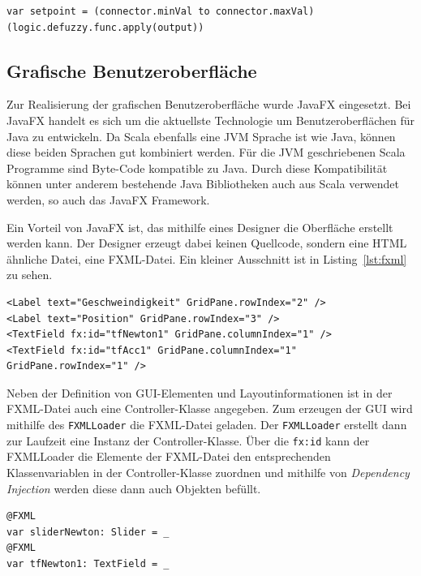 \documentclass[12pt,a4paper,bibliography=totocnumbered,listof=totocnumbered, abstracton]{scrartcl}
\theoremstyle{Umgebung}
\begin{document}
\begin{lstlisting}[firstnumber=1, style=myScalastyle, caption=Anwendung der Defuzzifizierungs-Methode, label=lst:defuzzy]
	var setpoint = (connector.minVal to connector.maxVal)(logic.defuzzy.func.apply(output))
\end{lstlisting}

\subsection{Grafische Benutzeroberfläche}
Zur Realisierung der grafischen Benutzeroberfläche wurde JavaFX eingesetzt. Bei JavaFX handelt es sich um die aktuellste Technologie um Benutzeroberflächen für Java zu entwickeln. Da Scala ebenfalls eine JVM Sprache ist wie Java, können diese beiden Sprachen gut kombiniert werden. Für die JVM geschriebenen Scala Programme sind Byte-Code kompatible zu Java. Durch diese Kompatibilität können unter anderem bestehende Java Bibliotheken auch aus Scala verwendet werden, so auch das JavaFX Framework.

Ein Vorteil von JavaFX ist, das mithilfe eines Designer die Oberfläche erstellt werden kann. Der Designer erzeugt dabei keinen Quellcode, sondern eine HTML ähnliche Datei, eine FXML-Datei. Ein kleiner Ausschnitt ist in Listing~\ref{lst:fxml} zu sehen.

\begin{lstlisting}[firstnumber=114, style=myScalastyle, caption={Kleiner Auszug aus einer FXML-Datei}, label=lst:fxml]
<Label text="Geschweindigkeit" GridPane.rowIndex="2" />
<Label text="Position" GridPane.rowIndex="3" />
<TextField fx:id="tfNewton1" GridPane.columnIndex="1" />
<TextField fx:id="tfAcc1" GridPane.columnIndex="1" GridPane.rowIndex="1" />
\end{lstlisting}

Neben der Definition von GUI-Elementen und Layoutinformationen ist in der FXML-Datei auch eine Controller-Klasse angegeben. Zum erzeugen der GUI wird mithilfe des \lstinline|FXMLLoader| die FXML-Datei geladen. Der \lstinline|FXMLLoader| erstellt dann zur Laufzeit eine Instanz der Controller-Klasse. Über die \lstinline|fx:id| kann der FXMLLoader die Elemente der FXML-Datei den entsprechenden Klassenvariablen in der Controller-Klasse zuordnen und mithilfe von \textit{Dependency Injection} werden diese dann auch Objekten befüllt.

\begin{lstlisting}[firstnumber=31, style=myScalastyle, caption=Annotierte Deklaration für den Slider und das Textfeld der Antriebskraft, label=lst:fxdeclaration]
@FXML
var sliderNewton: Slider = _
@FXML
var tfNewton1: TextField = _
\end{lstlisting}
\end{document}
